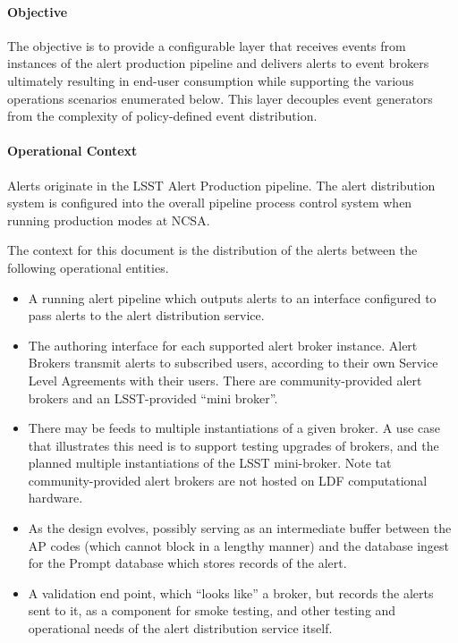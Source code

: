 \paragraph{Objective}

The objective is to provide a configurable layer that receives events from instances of the alert production pipeline and delivers alerts to event brokers ultimately resulting in end-user consumption while supporting the various operations scenarios enumerated below. This layer decouples event generators from the complexity of policy-defined event distribution.

\paragraph{Operational Context}
Alerts originate in the LSST Alert Production pipeline. The alert distribution system is configured into the overall pipeline process control system when running production modes at NCSA.

The context for this document is the distribution of the alerts between the following operational entities.

\begin{itemize}
\item A running alert pipeline which outputs alerts to an interface configured to pass alerts to the alert distribution service.

\item The authoring interface for each supported alert broker instance. Alert Brokers transmit alerts to subscribed users, according to their own Service Level Agreements with their users.  There are community-provided alert brokers and an LSST-provided “mini broker”.

\item There may be feeds to multiple instantiations of a given broker. A use case that illustrates this need is to support testing upgrades of brokers, and the planned multiple instantiations of the LSST mini-broker. Note tat community-provided alert brokers are not hosted on LDF computational hardware.

\item As the design evolves, possibly serving as an intermediate buffer between the AP codes (which cannot block in a lengthy manner) and the database ingest for the Prompt database which stores records of the alert.

\item A validation end point, which “looks like” a broker, but records the alerts sent to it, as a component for smoke testing, and other testing and operational needs of the alert distribution service itself.

\end{itemize}

